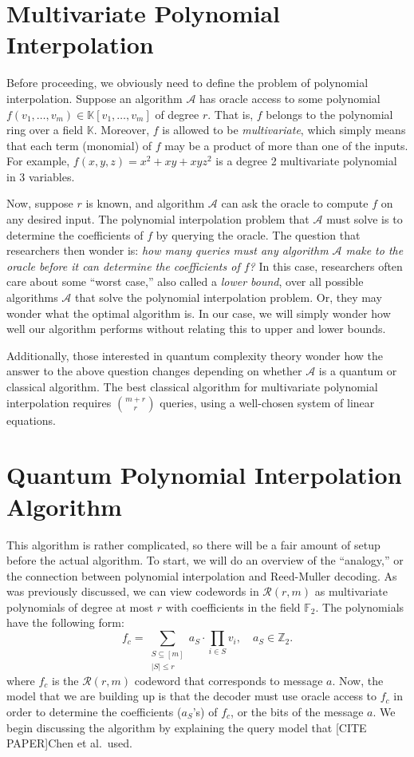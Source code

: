 \documentclass[12pt,twoside]{reedthesis}
\theoremstyle{definition}
\newcommand{\Z}{\mathbb{Z}}
\newcommand{\K}{\mathbb{K}}
\newcommand{\F}{\mathbb{F}}
\begin{document}
\section{Multivariate Polynomial Interpolation}
Before proceeding, we obviously need to define the problem of polynomial interpolation. Suppose an algorithm $\mathcal{A}$ has oracle access to some polynomial $f(v_1, \ldots, v_m) \in \K[v_1, \ldots, v_m]$ of degree $r$. That is, $f$ belongs to the polynomial ring over a field $\K$. Moreover, $f$ is allowed to be \textit{multivariate}, which simply means that each term (monomial) of $f$ may be a product of more than one of the inputs. For example, $f(x,y,z) = x^2 + xy + xyz^2$ is a degree 2 multivariate polynomial in 3 variables.

Now, suppose $r$ is known, and algorithm $\mathcal{A}$ can ask the oracle to compute $f$ on any desired input. The polynomial interpolation problem that $\mathcal{A}$ must solve is to determine the coefficients of $f$ by querying the oracle. The question that researchers then wonder is: \textit{how many queries must any algorithm $\mathcal{A}$ make to the oracle before it can determine the coefficients of $f$?} In this case, researchers often care about some ``worst case,'' also called a \textit{lower bound}, over all possible algorithms $\mathcal{A}$ that solve the polynomial interpolation problem. Or, they may wonder what the optimal algorithm is. In our case, we will simply wonder how well our algorithm performs without relating this to upper and lower bounds. 

Additionally, those interested in quantum complexity theory wonder how the answer to the above question changes depending on whether $\mathcal{A}$ is a quantum or classical algorithm. The best classical algorithm for multivariate polynomial interpolation requires ${m +r \choose r}$ queries, using a well-chosen system of linear equations.

\section{Quantum Polynomial Interpolation Algorithm}
This algorithm is rather complicated, so there will be a fair amount of setup before the actual algorithm. To start, we will do an overview of the ``analogy,'' or the connection between polynomial interpolation and Reed-Muller decoding. As was previously discussed, we can view codewords in $\mathscr{R}(r,m)$ as multivariate polynomials of degree at most $r$ with coefficients in the field $\F_2$. The polynomials have the following form:
\begin{equation*}
f_c = \sum_{\substack{S \subseteq [m] \\ \lvert S \rvert \leq r}} a_S \cdot \prod_{i \in S} v_i,  \quad a_S \in \Z_2.
\end{equation*}
where $f_c$ is the $\mathscr{R}(r,m)$ codeword that corresponds to message $a$. Now, the model that we are building up is that the decoder must use oracle access to $f_c$ in order to determine the coefficients ($a_S$'s) of $f_c$, or the bits of the message $a$. We begin discussing the algorithm by explaining the query model that [CITE PAPER]Chen et al.~used.
\end{document}
